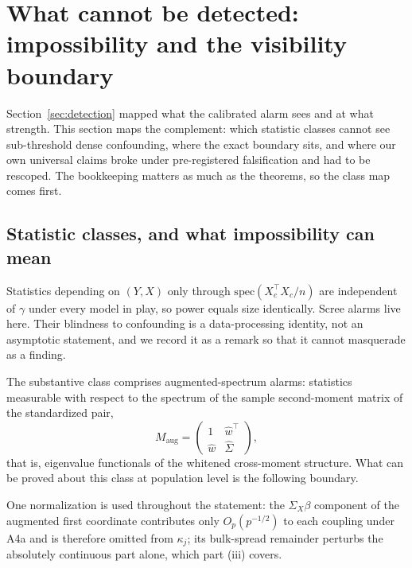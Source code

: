 \section{What cannot be detected: impossibility and the visibility boundary}
\label{sec:blindness}

Section~\ref{sec:detection} mapped what the calibrated alarm sees and at what strength. This section maps the complement: which statistic classes cannot see sub-threshold dense confounding, where the exact boundary sits, and where our own universal claims broke under pre-registered falsification and had to be rescoped. The bookkeeping matters as much as the theorems, so the class map comes first.

\subsection{Statistic classes, and what impossibility can mean}

\begin{remark}
\label{rem:purex}
Statistics depending on $(Y,X)$ only through $\mathrm{spec}(X_c^\top X_c/n)$ are independent of $\gamma$ under every model in play, so power equals size identically. Scree alarms live here. Their blindness to confounding is a data-processing identity, not an asymptotic statement, and we record it as a remark so that it cannot masquerade as a finding.
\end{remark}

The substantive class comprises augmented-spectrum alarms: statistics measurable with respect to the spectrum of the sample second-moment matrix of the standardized pair,
\[
M_{\mathrm{aug}}=\begin{pmatrix}1 & \hat w^\top\\ \hat w & \hat\Sigma\end{pmatrix},
\]
that is, eigenvalue functionals of the whitened cross-moment structure. What can be proved about this class at population level is the following boundary.

One normalization is used throughout the statement: the $\Sigma_X\beta$ component of the augmented first coordinate contributes only $O_p(p^{-1/2})$ to each coupling under A4a and is therefore omitted from $\kappa_j$; its bulk-spread remainder perturbs the absolutely continuous part alone, which part (iii) covers.

